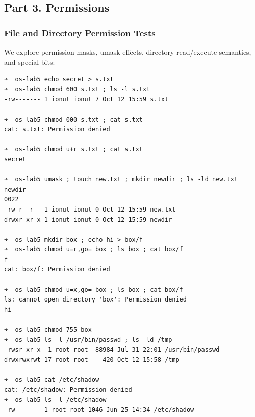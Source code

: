 \documentclass{labreport}
\begin{document}
\subsection{Part 3. Permissions}

\subsubsection{File and Directory Permission Tests}
We explore permission masks, umask effects, directory read/execute semantics, and special bits:

\begin{lstlisting}[style=bash]
➜  os-lab5 echo secret > s.txt
➜  os-lab5 chmod 600 s.txt ; ls -l s.txt
-rw------- 1 ionut ionut 7 Oct 12 15:59 s.txt

➜  os-lab5 chmod 000 s.txt ; cat s.txt
cat: s.txt: Permission denied

➜  os-lab5 chmod u+r s.txt ; cat s.txt
secret

➜  os-lab5 umask ; touch new.txt ; mkdir newdir ; ls -ld new.txt newdir
0022
-rw-r--r-- 1 ionut ionut 0 Oct 12 15:59 new.txt
drwxr-xr-x 1 ionut ionut 0 Oct 12 15:59 newdir

➜  os-lab5 mkdir box ; echo hi > box/f
➜  os-lab5 chmod u=r,go= box ; ls box ; cat box/f
f
cat: box/f: Permission denied

➜  os-lab5 chmod u=x,go= box ; ls box ; cat box/f
ls: cannot open directory 'box': Permission denied
hi

➜  os-lab5 chmod 755 box
➜  os-lab5 ls -l /usr/bin/passwd ; ls -ld /tmp
-rwsr-xr-x  1 root root  88984 Jul 31 22:01 /usr/bin/passwd
drwxrwxrwt 17 root root    420 Oct 12 15:58 /tmp

➜  os-lab5 cat /etc/shadow
cat: /etc/shadow: Permission denied
➜  os-lab5 ls -l /etc/shadow
-rw------- 1 root root 1046 Jun 25 14:34 /etc/shadow
\end{lstlisting}
\end{document}
